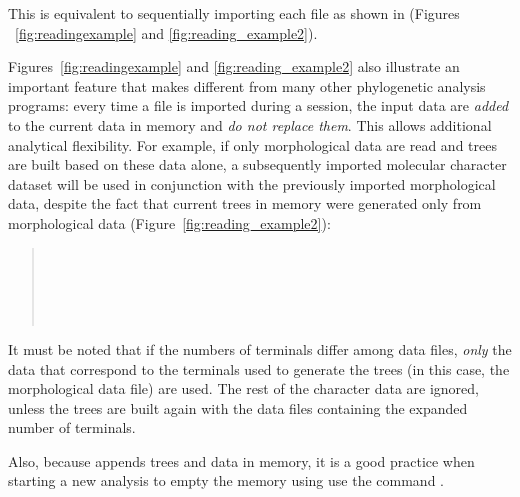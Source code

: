 {This is equivalent to sequentially importing each file as shown in (Figures ~\ref{fig:readingexample} and \ref{fig:reading_example2}).

Figures~\ref{fig:readingexample} and \ref{fig:reading_example2} also illustrate an important feature that makes \poy different from many other phylogenetic analysis programs: every time a file is imported during a \poy session, the input data are \emph{added} to the current data in memory and \emph{do not replace them}. This allows additional analytical flexibility. For example, if only morphological data are read and trees are built based on these data alone, a subsequently imported molecular character dataset will be used in conjunction with the previously imported morphological data, despite the fact that current trees in memory were generated only from morphological data (Figure~\ref{fig:reading_example2}):

\begin{quote}
\\
\\
\\
\\
\end{quote}

It must be noted that if the numbers of terminals differ among data files, \emph{only} the data that correspond to the terminals used to generate the trees (in this case, the morphological data file) are used. The rest of the character data are ignored, unless the trees are built again with the data files containing the expanded number of terminals.

Also, because \poy appends trees and data in memory, it is a good practice when starting a new analysis to empty the memory using use the command .

}
